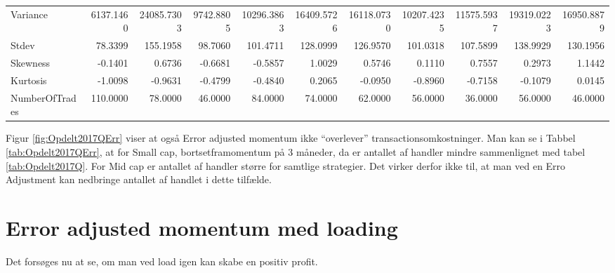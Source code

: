 \documentclass[]{article}
\begin{document}
\begin{table}
{\begin{tabular}[t]{lrrrrrrrrrr}
Variance & 6137.1460 & 24085.7303 & 9742.8805 & 10296.3863 & 16409.5726 & 16118.0730 & 10207.4235 & 11575.5937 & 19319.0223 & 16950.8879\\
Stdev & 78.3399 & 155.1958 & 98.7060 & 101.4711 & 128.0999 & 126.9570 & 101.0318 & 107.5899 & 138.9929 & 130.1956\\
Skewness & -0.1401 & 0.6736 & -0.6681 & -0.5857 & 1.0029 & 0.5746 & 0.1110 & 0.7557 & 0.2973 & 1.1442\\
\addlinespace
Kurtosis & -1.0098 & -0.9631 & -0.4799 & -0.4840 & 0.2065 & -0.0950 & -0.8960 & -0.7158 & -0.1079 & 0.0145\\
NumberOfTrades & 110.0000 & 78.0000 & 46.0000 & 84.0000 & 74.0000 & 62.0000 & 56.0000 & 36.0000 & 56.0000 & 46.0000\\
\bottomrule
\end{tabular}}
\end{table}

Figur \ref{fig:Opdelt2017QErr} viser at også Error adjusted momentum
ikke ``overlever'' transactionsomkostninger. Man kan se i Tabbel
\ref{tab:Opdelt2017QErr}, at for Small cap, bortsetframomentum på 3
måneder, da er antallet af handler mindre sammenlignet med tabel
\ref{tab:Opdelt2017Q}. For Mid cap er antallet af handler større for
samtlige strategier. Det virker derfor ikke til, at man ved en Erro
Adjustment kan nedbringe antallet af handlet i dette tilfælde.

\hypertarget{error-adjusted-momentum-med-loading}{%
\section{Error adjusted momentum med
loading}\label{error-adjusted-momentum-med-loading}}

Det forsøges nu at se, om man ved load igen kan skabe en positiv profit.
\end{document}
